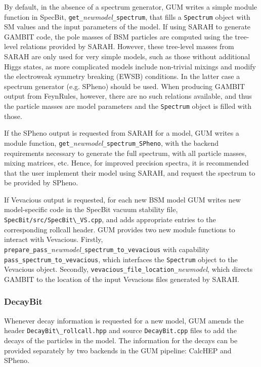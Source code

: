 \documentclass[pdftex,twocolumn,epjc3_preprint,runningheads]{svjour3}
\renewcommand{\_}{\discretionary{\underscore}{}{\underscore}}
\newcommand\cpp[1]{{\lstinline!#1!}}  %
\newcommand\term[1]{{\lstset{style=terminal}\lstinline!#1!\lstset{style=cpp}}}
\newcommand{\metavarf}[1]{\textit{\color{darkgreen}\footnotesize\textrm{#1}}}
\newcommand{\metavar}{\metavarf}
\newcommand{\gambit}{\textsf{GAMBIT}\xspace}
\newcommand{\specbit}{\textsf{SpecBit}\xspace}
\newcommand{\decaybit}{\textsf{DecayBit}\xspace}
\newcommand{\GB}{\gambit}
\newcommand{\gum}{\textsf{GUM}\xspace}
\newcommand{\fr}{\textsf{FeynRules}\xspace}
\newcommand{\sarah}{\textsf{SARAH}\xspace}
\newcommand{\CH}{\textsf{CalcHEP}\xspace}
\newcommand{\veva}{\textsf{Vevacious}\xspace}
\newcommand{\spheno}{\textsf{SPheno}\xspace}
\newcommand{\nm}{\metavar{new\_model}}
\begin{document}
By default, in the absence of a spectrum generator, \gum writes a simple module function in \specbit, \cpp{get_}\nm\cpp{_spectrum}, that fills a \cpp{Spectrum} object with SM values and the input parameters of the model. If using \sarah to generate \GB code, the pole masses of BSM particles are computed using the tree-level relations provided by \sarah. However, these tree-level masses from \sarah are only used for very simple models, such as those without additional Higgs states, as more complicated models include non-trivial mixings and modify the electroweak symmetry breaking (EWSB) conditions. In the latter case a spectrum generator (e.g. \spheno) should be used. When producing \GB output from \fr, however, there are no such relations available, and thus the particle masses are model parameters and the \cpp{Spectrum} object is filled with those.

If the \spheno output is requested from \sarah for a model, \gum writes a module function, \cpp{get_}\nm\cpp{_spectrum_SPheno}, with the backend requirements necessary to generate the full spectrum, with all particle masses, mixing matrices, etc. Hence, for improved precision spectra, it is recommended that the user implement their model using \sarah, and request the spectrum to be provided by \spheno.

If \veva output is requested, for each new BSM model \gum writes new model-specific code in the \specbit vacuum stability file, \term{SpecBit/src/SpecBit\_VS.cpp}, and adds appropriate entries to the corresponding rollcall header. \gum provides two new module functions to interact with \veva. Firstly, \cpp{prepare_pass_}\nm\cpp{_spectrum_to_vevacious} with capability \cpp{pass_spectrum_to_vevacious}, which interfaces the \cpp{Spectrum} object to the \veva object. Secondly, \cpp{vevacious_file_location_}\nm, which directs \GB to the location of the input \veva files generated by \sarah.

\subsubsection{\decaybit}

Whenever decay information is requested for a new model, \gum amends the header \term{DecayBit\_rollcall.hpp} and source \term{DecayBit.cpp} files to add the decays of the particles in the model. The information for the decays can be provided separately by two backends in the \gum pipeline: \CH and \spheno.
\end{document}
